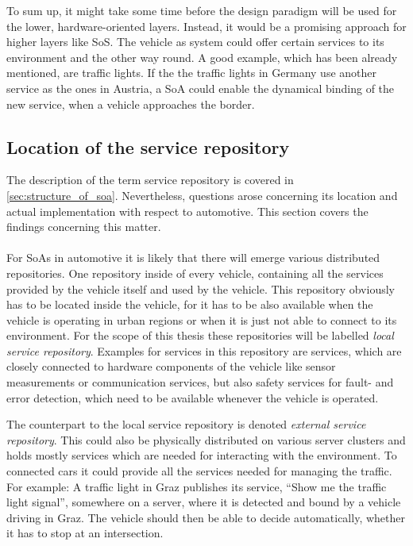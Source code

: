 To sum up, it might take some time before the design paradigm will be used for the lower, hardware-oriented layers. Instead, it would be a promising approach for higher layers like SoS. The vehicle as system could offer certain services to its environment and the other way round. A good example, which has been already mentioned, are traffic lights. If the the traffic lights in Germany use another service as the ones in Austria, a SoA could enable the dynamical binding of the new service, when a vehicle approaches the border.


\subsection{Location of the service repository}
The description of the term service repository is covered in \ref{sec:structure_of_soa}. Nevertheless, questions arose concerning its location and actual implementation with respect to automotive. This section covers the findings concerning this matter.
\\
\\
For SoAs in automotive it is likely that there will emerge various distributed repositories. One repository inside of every vehicle, containing all the services provided by the vehicle itself and used by the vehicle. This repository obviously has to be located inside the vehicle, for it has to be also available when the vehicle is operating in urban regions or when it is just not able to connect to its environment. For the scope of this thesis these repositories will be labelled \emph{local service repository}. Examples for services in this repository are services, which are closely connected to hardware components of the vehicle like sensor measurements or communication services, but also safety services for fault- and error detection, which need to be available whenever the vehicle is operated.

The counterpart to the local service repository is denoted \emph{external service repository}. This could also be physically distributed on various server clusters and holds mostly services which are needed for interacting with the environment. To connected cars it could provide all the services needed for managing the traffic. For example: A traffic light in Graz publishes its service, ``Show me the traffic light signal'', somewhere on a server, where it is detected and bound by a vehicle driving in Graz. The vehicle should then be able to decide automatically, whether it has to stop at an intersection.

